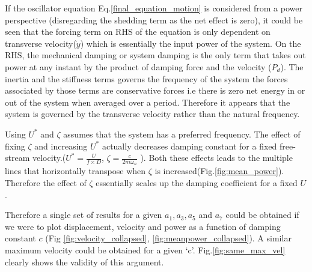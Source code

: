  If the oscillator equation Eq.\eqref{final_equation_motion} is considered from a power perspective (disregarding the shedding term as the net effect is zero), it could be seen that the forcing term on RHS of the equation is only dependent on transverse velocity($\dot{y}$) which is essentially the input power of the system. On the RHS, the mechanical damping or system damping is the only term that takes out power at any instant by the product of damping force and the velocity ($P_d$). The inertia and the stiffness terms governs the frequency of the system the forces associated by those terms are conservative forces i.e there is zero net energy in or out of the system when averaged over a period. Therefore it appears that the system is governed by the transverse velocity rather than the natural frequency.
 
 Using $U^*$ and $\zeta$ assumes that the system has a preferred frequency. The effect of fixing $\zeta$ and increasing $U^*$ actually decreases damping constant for a fixed free-stream velocity.($U^*=\frac{U}{f \times D}$, $\zeta= \frac{c}{2 m \omega_n}$ ). Both these effects leads to the multiple lines that horizontally transpose when $\zeta$ is increased(Fig.\ref{fig:mean_power}). Therefore the effect of $\zeta$ essentially scales up the damping coefficient for a fixed $U$.
 
 Therefore a single set of results for a given $a_1,a_3, a_5$ and $a_7$ could be obtained if we were to plot displacement, velocity and power as a function of damping constant $c$ (Fig \ref{fig:velocity_collapsed}, \ref{fig:meanpower_collapsed}). A similar maximum velocity could be obtained for a given `c'. Fig.\ref{fig:same_max_vel} clearly shows the validity of this argument. 


